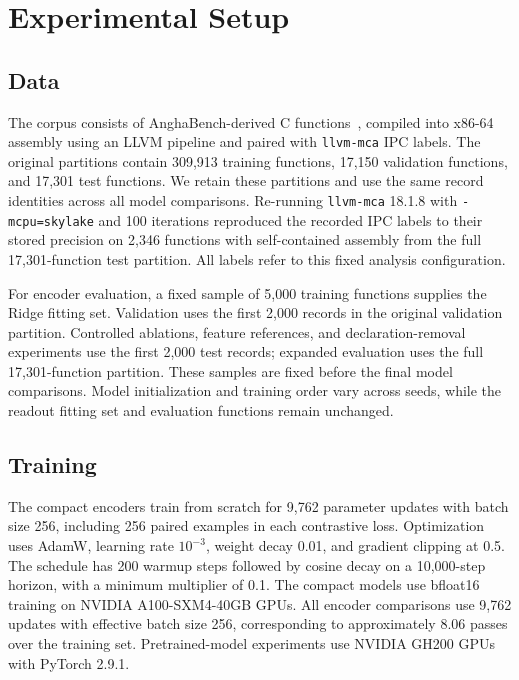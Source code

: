 \documentclass[conference]{IEEEtran}
\newenvironment{newtext}{\begingroup}{\endgroup}
\newcommand{\llvmmca}{\texttt{llvm-mca}}
\begin{document}
\section{Experimental Setup}
\subsection{Data}
The corpus consists of AnghaBench-derived C functions~\cite{da2021anghabench}, compiled into x86-64 assembly using an LLVM pipeline and paired with \llvmmca{} IPC labels. The original partitions contain 309,913 training functions, 17,150 validation functions, and 17,301 test functions. We retain these partitions and use the same record identities across all model comparisons.
\begin{newtext}
Re-running \llvmmca{} 18.1.8 with \texttt{-mcpu=skylake} and 100 iterations reproduced the recorded IPC labels to their stored precision on 2,346 functions with self-contained assembly from the full 17,301-function test partition. All labels refer to this fixed analysis configuration.
\end{newtext}

For encoder evaluation, a fixed sample of 5,000 training functions supplies the Ridge fitting set. Validation uses the first 2,000 records in the original validation partition. Controlled ablations, feature references, and declaration-removal experiments use the first 2,000 test records; expanded evaluation uses the full 17,301-function partition. These samples are fixed before the final model comparisons. Model initialization and training order vary across seeds, while the readout fitting set and evaluation functions remain unchanged. 

\subsection{Training}
The compact encoders train from scratch for 9,762 parameter updates with batch size 256, including 256 paired examples in each contrastive loss. Optimization uses AdamW, learning rate $10^{-3}$, weight decay 0.01, and gradient clipping at 0.5. The schedule has 200 warmup steps followed by cosine decay on a 10,000-step horizon, with a minimum multiplier of 0.1. The compact models use bfloat16 training on NVIDIA A100-SXM4-40GB GPUs. All encoder comparisons use 9,762 updates with effective batch size 256, corresponding to approximately 8.06 passes over the training set. Pretrained-model experiments use NVIDIA GH200 GPUs with PyTorch 2.9.1. 
\end{document}
